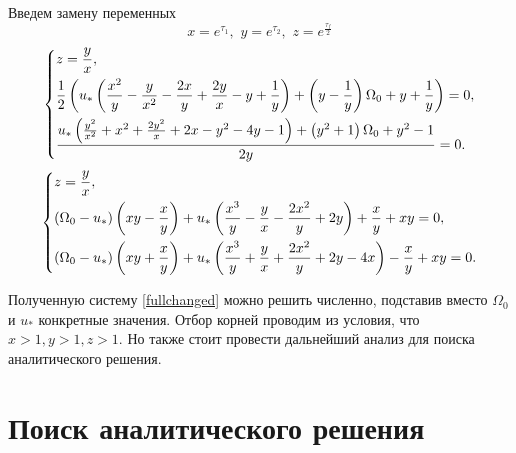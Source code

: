 \documentclass[a4paper,12pt, openany]{book}
\theoremstyle{plain} %
\theoremstyle{definition} %
\theoremstyle{remark} %
\numberwithin{equation}{chapter}
\begin{document}
{Введем замену переменных
\[
    x=e^{\tau_1} ,\,\,y=e^{\tau_2} ,\,\,z=e^{\frac{\tau_f}{2}}
\]
\[
    \left\{ {\begin{aligned}
                 & z=\frac{y}{x}, \hfill                                                         \\
                 & \frac{1}{2} \left(u_* \left(\frac{x^2}{y}-\frac{y}{x^2}-\frac{2 x}{y}+\frac{2
                        y}{x}-y+\frac{1}{y}\right)+\left(y-\frac{1}{y}\right) \Omega
                _0+y+\frac{1}{y}\right)=0, \hfill                                                \\
                 & \frac{u_* \left(\frac{y^2}{x^2}+x^2+\frac{2 y^2}{x}+2 x-y^2-4
                y-1\right)+\left(y^2+1\right) \Omega _0+y^2-1}{2 y}=0. \hfill                    \\
            \end{aligned}} \right.
\]
\begin{equation}\label{fullchanged}
    \left\{ {\begin{aligned}
                 & z=\frac{y}{x}, \hfill                                                                                                              \\
                 & (\Omega_0-u_*)\left( xy-\frac{x}{y}\right)+u_*\left(\frac{x^3}{y}-\frac{y}{x}-\frac{2x^2}{y}+2y\right)+\frac{x}{y}+xy=0, \hfill    \\
                 & (\Omega_0-u_*)\left( xy+\frac{x}{y}\right)+u_*\left(\frac{x^3}{y}+\frac{y}{x}+\frac{2x^2}{y}+2y-4x\right)-\frac{x}{y}+xy=0. \hfill \\
            \end{aligned}} \right.
\end{equation}

Полученную систему \eqref{fullchanged} можно решить численно, подставив вместо $\Omega_0$ и $u_\ast$ конкретные значения.
Отбор корней проводим из условия, что $x>1,y>1,z>1$.
Но также стоит провести дальнейший анализ для поиска аналитического решения.
\section{Поиск аналитического решения}

}
\end{document}
